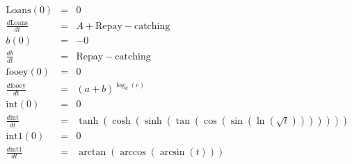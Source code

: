 \documentclass{article}
\begin{document}
\begin{eqnarray*}
\mathrm{Loans}(0)&=&0\\
\frac{ d \mathrm{Loans}}{dt} &=&A+\mathrm{Repay}-\mathrm{catching}\\
b(0)&=&-0\\
\frac{ d b}{dt} &=&\mathrm{Repay}-\mathrm{catching}\\
\mathrm{fooey}(0)&=&0\\
\frac{ d \mathrm{fooey}}{dt} &=&\left(a+b\right)^{\log_{d}\left(c\right)}\\
\mathrm{int}(0)&=&0\\
\frac{ d \mathrm{int}}{dt} &=&\tanh\left(\cosh\left(\sinh\left(\tan\left(\cos\left(\sin\left(\ln\left(\sqrt{ t }\right)\right)\right)\right)\right)\right)\right)\\
\mathrm{int1}(0)&=&0\\
\frac{ d \mathrm{int1}}{dt} &=&\arctan\left(\arccos\left(\arcsin\left( t \right)\right)\right)\\
\end{eqnarray*}
\end{document}
